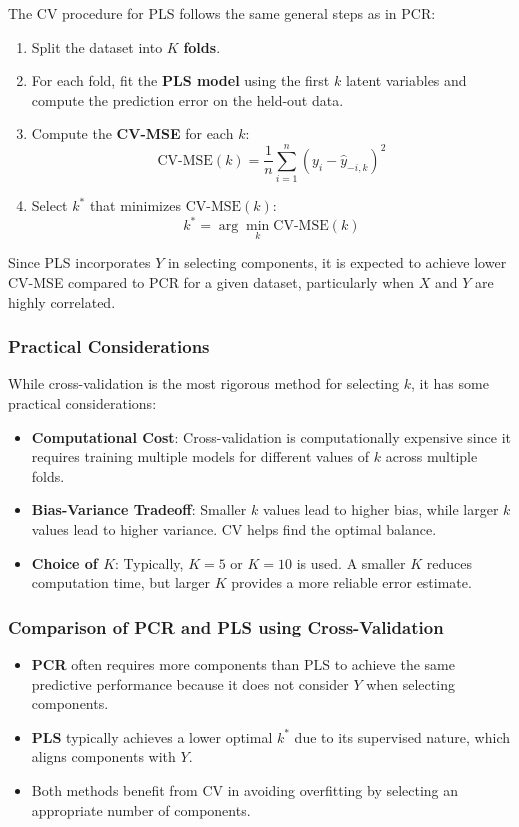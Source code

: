 \documentclass[11pt,twoside,a4paper]{article}
\begin{document}
The CV procedure for PLS follows the same general steps as in PCR:
\begin{enumerate}
    \item Split the dataset into \( K \) \textbf{folds}.
    \item For each fold, fit the \textbf{PLS model} using the first \( k \) latent variables and compute the prediction error on the held-out data.
    \item Compute the \textbf{CV-MSE} for each \( k \):
    \begin{equation}
    \text{CV-MSE}(k) = \frac{1}{n} \sum_{i=1}^{n} (y_i - \hat{y}_{-i,k})^2
    \end{equation}
    \item Select \( k^* \) that minimizes \(\text{CV-MSE}(k)\):
    \begin{equation}
    k^* = \arg\min_k \text{CV-MSE}(k)
    \end{equation}
\end{enumerate}

Since PLS incorporates \( Y \) in selecting components, it is expected to achieve lower CV-MSE compared to PCR for a given dataset, particularly when \( X \) and \( Y \) are highly correlated.

\subsubsection{Practical Considerations}
While cross-validation is the most rigorous method for selecting \( k \), it has some practical considerations:
\begin{itemize}
    \item \textbf{Computational Cost}: Cross-validation is computationally expensive since it requires training multiple models for different values of \( k \) across multiple folds.
    \item \textbf{Bias-Variance Tradeoff}: Smaller \( k \) values lead to higher bias, while larger \( k \) values lead to higher variance. CV helps find the optimal balance.
    \item \textbf{Choice of \( K \)}: Typically, \( K = 5 \) or \( K = 10 \) is used. A smaller \( K \) reduces computation time, but larger \( K \) provides a more reliable error estimate.
\end{itemize}

\subsubsection{Comparison of PCR and PLS using Cross-Validation}
\begin{itemize}
    \item \textbf{PCR} often requires more components than PLS to achieve the same predictive performance because it does not consider \( Y \) when selecting components.
    \item \textbf{PLS} typically achieves a lower optimal \( k^* \) due to its supervised nature, which aligns components with \( Y \).
    \item Both methods benefit from CV in avoiding overfitting by selecting an appropriate number of components.
\end{itemize}
\end{document}
